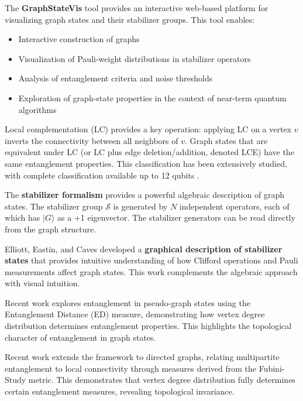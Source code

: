 \documentclass[%
 amsmath,amssymb,
 aps,
rmp,
]{revtex4-2}
\begin{document}




The \textbf{GraphStateVis} tool \cite{GraphStateVis} provides an interactive web-based platform for visualizing graph states and their stabilizer groups. This tool enables:
\begin{itemize}
	\item Interactive construction of graphs
	\item Visualization of Pauli-weight distributions in stabilizer operators
	\item Analysis of entanglement criteria and noise thresholds
	\item Exploration of graph-state properties in the context of near-term quantum algorithms
\end{itemize}

Local complementation (LC) provides a key operation: applying LC on a vertex $v$ inverts the connectivity between all neighbors of $v$. Graph states that are equivalent under LC (or LC plus edge deletion/addition, denoted LCE) have the same entanglement properties. This classification has been extensively studied, with complete classification available up to 12 qubits \cite{hein2004entanglement,danielsen2008graph}.




The \textbf{stabilizer formalism} provides a powerful algebraic description of graph states. The stabilizer group $\mathcal{S}$ is generated by $N$ independent operators, each of which has $|G\rangle$ as a +1 eigenvector. The stabilizer generators can be read directly from the graph structure.

Elliott, Eastin, and Caves developed a \textbf{graphical description of stabilizer states} that provides intuitive understanding of how Clifford operations and Pauli measurements affect graph states. This work complements the algebraic approach with visual intuition.

Recent work explores entanglement in pseudo-graph states using the Entanglement Distance (ED) measure, demonstrating how vertex degree distribution determines entanglement properties. This highlights the topological character of entanglement in graph states.

Recent work extends the framework to directed graphs, relating multipartite entanglement to local connectivity through measures derived from the Fubini-Study metric. This demonstrates that vertex degree distribution fully determines certain entanglement measures, revealing topological invariance.
\end{document}
